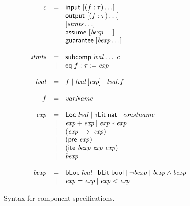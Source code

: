 \begin{figure}
  \[
    \begin{array}{rcl}
      \mathit{c}    & = & \konst{input}\ [(f : \tau)\ldots] \\
                    &   & \konst{output}\ [(f : \tau)\ldots] \\
                    &   & [\mathit{stmts}\ldots] \\
                    &   & \konst{assume}\ [\mathit{bexp}\ldots] \\
                    &   & \konst{guarantee}\ [\mathit{bexp}\ldots] \\ \\
      
      \mathit{stmts}& = & \konst{subcomp}\ \lval\dots\ c \\
                    & | & \konst{eq}\; f : \tau := \mathit{exp} \\ \\
                    
      \lval & = & f \mid \lval \, [ \mathit{exp} ]
                          \mid \lval . f \\ \\

      f             & = & \mathit{varName} \\ \\

      \mathit{exp}  & = & \konst{Loc}\; \lval
                          \mid \konst{nLit}\; \konst{nat}
                          \mid \mathit{constname} \\
                    & | & \mathit{exp} + \mathit{exp}
                          \mid \mathit{exp} * \mathit{exp} \\
                    & | & (\mathit{exp}\ \rightarrow\ \mathit{exp}) \\
                    & | & (\konst{pre}\ \mathit{exp}) \\
                    & | & (\konst{ite}\ \mathit{bexp}\ \mathit{exp}\ \mathit{exp})\\
                    & | & \mathit{bexp} \\ \\
                          
      \mathit{bexp} & = & \konst{bLoc}\; \lval
                          \mid  \konst{bLit}\; \konst{bool}
                          \mid  \neg \mathit{bexp}
                          \mid  \mathit{bexp} \land \mathit{bexp} \\
                    & | & \mathit{exp} = \mathit{exp} 
                    \mid  \mathit{exp} < \mathit{exp}
\end{array}
\]
\caption{Syntax for component specifications.}
\label{fig:syntax}
\end{figure}

